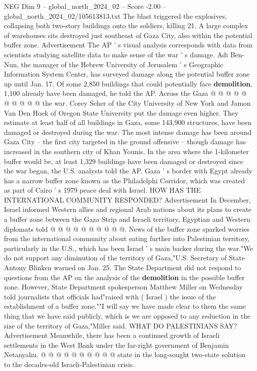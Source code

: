 \begin{textsample}{NEG Dim 9 – global\_north\_2024\_02 – Score -2.00 – global\_north\_2024\_02/105613813.txt}
The blast triggered the explosives, collapsing both two-story buildings onto the soldiers, killing 21.
A large complex of warehouses sits destroyed just southeast of Gaza City, also within the potential buffer zone.
Advertisement The AP ' s visual analysis corresponds with data from scientists studying satellite data to make sense of the war ' s damage.
Adi Ben-Nun, the manager of the Hebrew University of Jerusalem ' s Geographic Information System Center, has surveyed damage along the potential buffer zone up until Jan. 17.
Of some 2,850 buildings that could potentially face \textbf{demolition}, 1,100 already have been damaged, he told the AP.
Across the Gaza @ @ @ @ @ @ @ @ @ @ the war.
Corey Scher of the City University of New York and Jamon Van Den Hoek of Oregon State University put the damage even higher.
They estimate at least half of all buildings in Gaza, some 143,900 structures, have been damaged or destroyed during the war.
The most intense damage has been around Gaza City -- the first city targeted in the ground offensive -- though damage has increased in the southern city of Khan Younis.
In the area where the 1-kilometer buffer would be, at least 1,329 buildings have been damaged or destroyed since the war began, the U.S. analysts told the AP.
Gaza ' s border with Egypt already has a narrow buffer zone known as the Philadelphi Corridor, which was created as part of Cairo ' s 1979 peace deal with Israel.
HOW HAS THE INTERNATIONAL COMMUNITY RESPONDED?
Advertisement In December, Israel informed Western allies and regional Arab nations about its plans to create a buffer zone between the Gaza Strip and Israeli territory, Egyptian and Western diplomats told @ @ @ @ @ @ @ @ @ @.
News of the buffer zone sparked worries from the international community about eating further into Palestinian territory, particularly in the U.S., which has been Israel ' s main backer during the war."We do not support any diminution of the territory of Gaza,"U.S.
Secretary of State Antony Blinken warned on Jan. 25.
The State Department did not respond to questions from the AP on the analysis of the \textbf{demolition} in the possible buffer zone.
However, State Department spokesperson Matthew Miller on Wednesday told journalists that officials had"raised with ( Israel ) the issue of the establishment of a buffer zone.""I will say we have made clear to them the same thing that we have said publicly, which is we are opposed to any reduction in the size of the territory of Gaza,"Miller said.
WHAT DO PALESTINIANS SAY?
Advertisement Meanwhile, there has been a continued growth of Israeli settlements in the West Bank under the far-right government of Benjamin Netanyahu. @ @ @ @ @ @ @ @ @ @ state in the long-sought two-state solution to the decades-old Israeli-Palestinian crisis.

\end{textsample}
